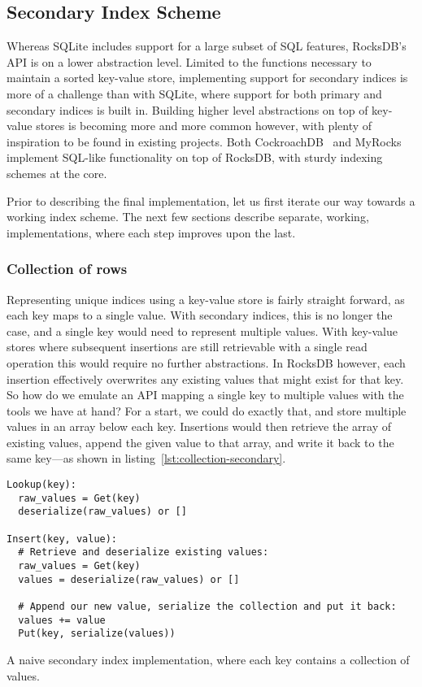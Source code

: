 \subsection{Secondary Index Scheme}

Whereas SQLite includes support for a large subset of SQL features, RocksDB's
API is on a lower abstraction level. Limited to the functions necessary to
maintain a sorted key-value store, implementing support for secondary indices is
more of a challenge than with SQLite, where support for both primary and
secondary indices is built in. Building higher level abstractions on top of
key-value stores is becoming more and more common however, with plenty of
inspiration to be found in existing projects. Both CockroachDB~\cite{cockroach}
and MyRocks~\cite{myrocks} implement SQL-like functionality on top of RocksDB,
with sturdy indexing schemes at the core.

Prior to describing the final implementation, let us first iterate our way
towards a working index scheme. The next few sections describe separate,
working, implementations, where each step improves upon the last.

\subsubsection{Collection of rows}

Representing unique indices using a key-value store is fairly straight forward,
as each key maps to a single value. With secondary indices, this is no longer
the case, and a single key would need to represent multiple values. With
key-value stores where subsequent insertions are still retrievable with a single
read operation this would require no further abstractions. In RocksDB however,
each insertion effectively overwrites any existing values that might exist for
that key. So how do we emulate an API mapping a single key to multiple values
with the tools we have at hand? For a start, we could do exactly that, and store
multiple values in an array below each key. Insertions would then retrieve the
array of existing values, append the given value to that array, and write it
back to the same key---as shown in listing~\ref{lst:collection-secondary}.

\begin{listing}[H]
  \begin{verbatim}
Lookup(key):
  raw_values = Get(key)
  deserialize(raw_values) or []

Insert(key, value):
  # Retrieve and deserialize existing values:
  raw_values = Get(key)
  values = deserialize(raw_values) or []

  # Append our new value, serialize the collection and put it back:
  values += value
  Put(key, serialize(values))
  \end{verbatim}

  \caption{A naive secondary index implementation, where each key contains a
  collection of values.}\label{lst:collection-secondary}
\end{listing}

